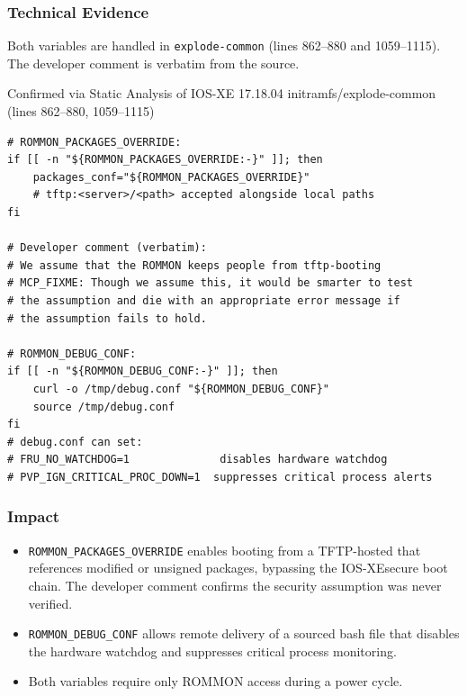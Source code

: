 \documentclass[11pt,a4paper]{article}
\begin{document}
\subsubsection{Technical Evidence}

Both variables are handled in \texttt{explode-common} (lines 862--880 and 1059--1115).
The developer comment is verbatim from the source.

\begin{pocbox}{Confirmed via Static Analysis of IOS-XE 17.18.04 initramfs/explode-common (lines 862--880, 1059--1115)}
\begin{lstlisting}[style=bash]
# ROMMON_PACKAGES_OVERRIDE:
if [[ -n "${ROMMON_PACKAGES_OVERRIDE:-}" ]]; then
    packages_conf="${ROMMON_PACKAGES_OVERRIDE}"
    # tftp:<server>/<path> accepted alongside local paths
fi

# Developer comment (verbatim):
# We assume that the ROMMON keeps people from tftp-booting
# MCP_FIXME: Though we assume this, it would be smarter to test
# the assumption and die with an appropriate error message if
# the assumption fails to hold.

# ROMMON_DEBUG_CONF:
if [[ -n "${ROMMON_DEBUG_CONF:-}" ]]; then
    curl -o /tmp/debug.conf "${ROMMON_DEBUG_CONF}"
    source /tmp/debug.conf
fi
# debug.conf can set:
# FRU_NO_WATCHDOG=1              disables hardware watchdog
# PVP_IGN_CRITICAL_PROC_DOWN=1  suppresses critical process alerts
\end{lstlisting}
\end{pocbox}

\subsubsection{Impact}

\begin{itemize}[nosep]
  \item \texttt{ROMMON\_PACKAGES\_OVERRIDE} enables booting from a TFTP-hosted
     that references modified or unsigned packages, bypassing
    the IOS-XE\@ secure boot chain. The developer comment confirms the security
    assumption was never verified.
  \item \texttt{ROMMON\_DEBUG\_CONF} allows remote delivery of a sourced bash file
    that disables the hardware watchdog and suppresses critical process monitoring.
  \item Both variables require only ROMMON access during a power cycle.
\end{itemize}
\end{document}
